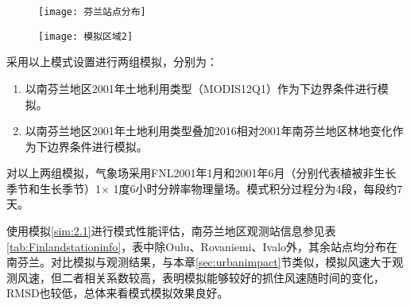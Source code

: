 \begin{figure}[!hbtp]
    \centering
    \texttt{[image: 芬兰站点分布]}
        \label{fig:Finlandstations}
\end{figure}

\begin{figure}[!hbtp]
    \centering
    \texttt{[image: 模拟区域2]}
        \label{fig:Finmodeldomain}
\end{figure}

采用以上模式设置进行两组模拟，分别为：

\begin{enumerate}

\item \label{sim:2.1} 以南芬兰地区2001年土地利用类型（MODIS12Q1）作为下边界条件进行模拟。

\item \label{sim:2.2} 以南芬兰地区2001年土地利用类型叠加2016相对2001年南芬兰地区林地变化作为下边界条件进行模拟。

\end{enumerate}

对以上两组模拟，气象场采用FNL2001年1月和2001年6月（分别代表植被非生长季节和生长季节）1$\times$ 1度6小时分辨率物理量场。模式积分过程分为4段，每段约7天。

使用模拟\ref{sim:2.1}进行模式性能评估，南芬兰地区观测站信息参见表 \ref{tab:Finlandstationinfo}，表中除Oulu、Rovaniemi、Ivalo外，其余站点均分布在南芬兰。对比模拟与观测结果，与本章\ref{sec:urbanimpact}节类似，模拟风速大于观测风速，但二者相关系数较高，表明模拟能够较好的抓住风速随时间的变化，RMSD也较低，总体来看模式模拟效果良好。

